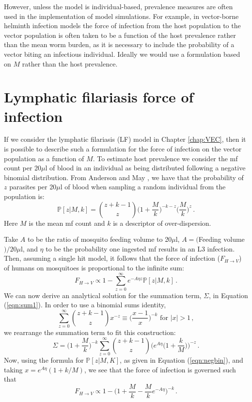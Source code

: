 However, unless the model is individual-based, prevalence measures are often used in the implementation of model simulations. For example, in vector-borne helminth infection models the force of infection from the host population to the vector population is often taken to be a function of the host prevalence rather than the mean worm burden, as it is necessary to include the probability of a vector biting an infectious individual. Ideally we would use a formulation based on $M$ rather than the host prevalence.

\section[LF]{Lymphatic filariasis force of infection}

If we consider the lymphatic filariasis (LF) model in Chapter \ref{chap:VEC}, then it is possible to describe such a formulation for the force of infection on the vector population as a function of $M$. To estimate host prevalence we consider the mf count per 20$\mu$l of blood in an individual as being distributed following a negative binomial distribution. From Anderson and May \cite{Anderson1992}, we have that the probability of $z$ parasites per 20$\mu$l of blood when sampling a random individual from the population is:
\begin{equation}
\mathbb{P}[z|M,k] = \binom{z+k-1}{z} \Big(1+\frac{M}{k}\Big)^{-k-z}\Big(\frac{M}{k}\Big)^z\,.
\label{eqn:negbin}
\end{equation}
Here $M$ is the mean mf count and $k$ is a descriptor of over-dispersion.

Take $A$ to be the ratio of mosquito feeding volume to 20$\mu$l, $A=($Feeding volume$)/20\mu$l, and $\eta$ to be the probability one ingested mf results in an L3 infection. Then, assuming a single hit model, it follows that the force of infection ($F_{H\rightarrow V}$) of humans on mosquitoes is proportional to the infinite sum:
\begin{equation}
F_{H\rightarrow V} \propto 1-\sum_{z=0}^{\infty}e^{-A\eta z}\mathbb{P}[z|M,k]\,.
\label{eqn:sum1}
\end{equation} 
We can now derive an analytical solution for the summation term, $\Sigma$, in Equation (\ref{eqn:sum1}). In order to use a binomial sums identity, 
\begin{equation}
\sum_{z=0}^{\infty}\binom{z+k-1}{z}x^{-z} \equiv \Big(\frac{x-1}{x}\Big)^{-k} \mbox{ for } |x|>1\,,
\end{equation}
we rearrange the summation term to fit this construction:
\begin{equation}
\Sigma =\bigg(1+\frac{M}{k}\bigg)^{-k}\sum_{z=0}^{\infty}\binom{z+k-1}{z}\bigg(e^{A\eta}\bigg(1+\frac{k}{M}\bigg)\bigg)^{-z}\,.
\end{equation}
Now, using the formula for $\mathbb{P}[z|M,K]$, as given in Equation (\ref{eqn:negbin}), and taking $x=e^{A\eta}(1+ k/M)$, we see that the force of infection is governed such that
\begin{equation}
F_{H\rightarrow V} \propto 1 - \bigg(1+\frac{M}{k}-\frac{M}{k}e^{-A\eta}\bigg)^{-k}\,.
\end{equation}

